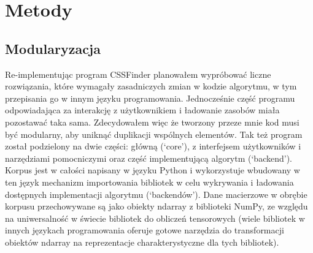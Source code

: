 \documentclass[11pt, a4paper]{article}
\begin{document}
\begin{sloppypar}
    \section{Metody}

    \subsection{Modularyzacja}
    Re-implementując program CSSFinder planowałem wypróbować liczne rozwiązania, które
    wymagały zasadniczych zmian w kodzie algorytmu, w tym przepisania go w innym języku programowania.
    Jednocześnie część programu odpowiadająca za interakcję z użytkownikiem i ładowanie
    zasobów miała pozostawać taka sama. Zdecydowałem więc że tworzony przeze mnie kod musi
    być modularny, aby uniknąć duplikacji wspólnych elementów. Tak też program został podzielony
    na dwie części: główną (`core'), z interfejsem użytkowników i narzędziami pomocniczymi
    oraz część implementującą algorytm (`backend'). Korpus jest w całości napisany w
    języku Python i wykorzystuje wbudowany w ten język mechanizm importowania bibliotek
    w celu wykrywania i ładowania dostępnych implementacji algorytmu (`backendów'). Dane
    macierzowe w obrębie korpusu przechowywane są jako obiekty ndarray z biblioteki NumPy,
    ze względu na uniwersalność w świecie bibliotek do obliczeń tensorowych (wiele bibliotek
    w innych językach programowania oferuje gotowe narzędzia do transformacji obiektów ndarray
    na reprezentacje charakterystyczne dla tych bibliotek).


\end{sloppypar}
\end{document}
